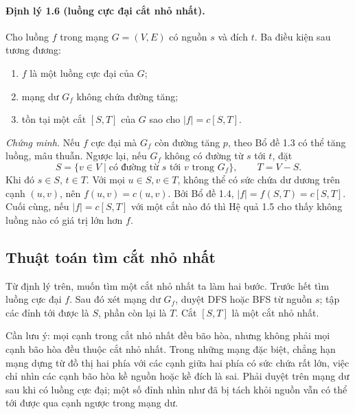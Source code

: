 \documentclass[11pt]{article}
\begin{document}
\paragraph{Định lý 1.6 (luồng cực đại cắt nhỏ nhất).}
Cho luồng \(f\) trong mạng \(G=(V,E)\) có nguồn \(s\) và đích \(t\). Ba điều
kiện sau tương đương:
\begin{enumerate}
  \item \(f\) là một luồng cực đại của \(G\);
  \item mạng dư \(G_f\) không chứa đường tăng;
  \item tồn tại một cắt \([S,T]\) của \(G\) sao cho \(|f|=c[S,T]\).
\end{enumerate}
\emph{Chứng minh.}
Nếu \(f\) cực đại mà \(G_f\) còn đường tăng \(p\), theo Bổ đề 1.3 có thể tăng
luồng, mâu thuẫn. Ngược lại, nếu \(G_f\) không có đường từ \(s\) tới \(t\),
đặt
\[
  S=\{v\in V\mid \text{có đường từ }s\text{ tới }v\text{ trong }G_f\},\qquad
  T=V-S.
\]
Khi đó \(s\in S\), \(t\in T\). Với mọi \(u\in S, v\in T\), không thể có
sức chứa dư dương trên cạnh \((u,v)\), nên \(f(u,v)=c(u,v)\). Bởi Bổ đề 1.4,
\(|f|=f(S,T)=c[S,T]\). Cuối cùng, nếu \(|f|=c[S,T]\) với một cắt nào đó thì
Hệ quả 1.5 cho thấy không luồng nào có giá trị lớn hơn \(f\).

\subsection{Thuật toán tìm cắt nhỏ nhất}

Từ định lý trên, muốn tìm một cắt nhỏ nhất ta làm hai bước. Trước hết tìm
luồng cực đại \(f\). Sau đó xét mạng dư \(G_f\), duyệt DFS hoặc BFS từ nguồn
\(s\); tập các đỉnh tới được là \(S\), phần còn lại là \(T\). Cắt \([S,T]\) là
một cắt nhỏ nhất.

Cần lưu ý: mọi cạnh trong cắt nhỏ nhất đều bão hòa, nhưng không phải mọi cạnh
bão hòa đều thuộc cắt nhỏ nhất. Trong những mạng đặc biệt, chẳng hạn mạng
dựng từ đồ thị hai phía với các cạnh giữa hai phía có sức chứa rất lớn, việc
chỉ nhìn các cạnh bão hòa kề nguồn hoặc kề đích là sai. Phải duyệt trên mạng
dư sau khi có luồng cực đại; một số đỉnh nhìn như đã bị tách khỏi nguồn vẫn
có thể tới được qua cạnh ngược trong mạng dư.
\end{document}
